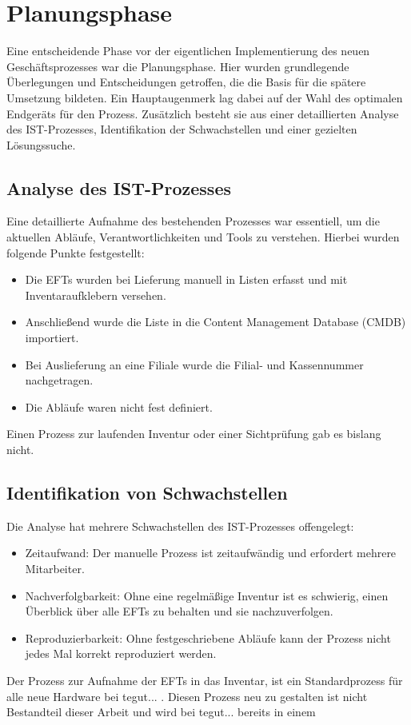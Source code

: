 \documentclass[12pt, a4paper]{article}
\begin{document}
\section{Planungsphase}

Eine entscheidende Phase vor der eigentlichen Implementierung des neuen Geschäftsprozesses war die Planungsphase. Hier wurden grundlegende Überlegungen und Entscheidungen 
getroffen, die die Basis für die spätere Umsetzung bildeten. Ein Hauptaugenmerk lag dabei auf der Wahl des optimalen Endgeräts für den Prozess.
Zusätzlich besteht sie aus einer detaillierten Analyse des IST-Prozesses, Identifikation der Schwachstellen und einer gezielten Lösungssuche.

\subsection{Analyse des IST-Prozesses}

Eine detaillierte Aufnahme des bestehenden Prozesses war essentiell, um die aktuellen Abläufe, Verantwortlichkeiten und Tools zu verstehen. Hierbei wurden folgende Punkte 
festgestellt:
\begin{itemize}
\item Die EFTs wurden bei Lieferung manuell in Listen erfasst und mit Inventaraufklebern versehen.
\item Anschließend wurde die Liste in die Content Management Database (CMDB) importiert.
\item Bei Auslieferung an eine Filiale wurde die Filial- und Kassennummer nachgetragen.
\item Die Abläufe waren nicht fest definiert.
\end{itemize}
Einen Prozess zur laufenden Inventur oder einer Sichtprüfung gab es bislang nicht.

\subsection{Identifikation von Schwachstellen}

Die Analyse hat mehrere Schwachstellen des IST-Prozesses offengelegt:
\begin{itemize}
\item Zeitaufwand: Der manuelle Prozess ist zeitaufwändig und erfordert mehrere Mitarbeiter.
\item Nachverfolgbarkeit: Ohne eine regelmäßige Inventur ist es schwierig, einen Überblick über alle EFTs zu behalten und sie nachzuverfolgen.
\item Reproduzierbarkeit: Ohne festgeschriebene Abläufe kann der Prozess nicht jedes Mal korrekt reproduziert werden.
\end{itemize}
Der Prozess zur Aufnahme der EFTs in das Inventar, ist ein Standardprozess für alle neue Hardware bei tegut... . Diesen Prozess neu zu gestalten ist nicht Bestandteil dieser
Arbeit und wird bei tegut... bereits in einem 
\end{document}
